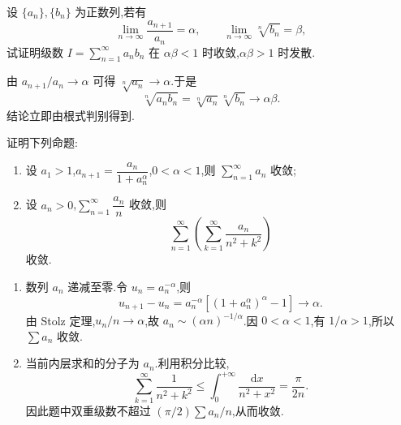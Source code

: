 \begin{example}
    设 $\{a_n\},\{b_n\}$ 为正数列,若有
    \[
        \displaystyle\lim\limits_{n\to\infty}\dfrac{a_{n+1}}{a_n}=\alpha,
        \qquad
        \lim\limits_{n\to\infty}\sqrt[n]{b_n}=\beta,
    \]
    试证明级数 $\displaystyle I=\sum\limits_{n=1}^{\infty}a_nb_n$ 在 $\alpha\beta<1$ 时收敛,$\alpha\beta>1$ 时发散.
\end{example}
\exampleblank

\begin{solution}
    由 $a_{n+1}/a_n\to\alpha$ 可得 $\sqrt[n]{a_n}\to\alpha$.于是
    \[
        \sqrt[n]{a_nb_n}=\sqrt[n]{a_n}\sqrt[n]{b_n}\longrightarrow\alpha\beta.
    \]
    结论立即由根式判别得到.
\end{solution}




\begin{example}
    证明下列命题:
    \begin{enumerate}
        \item 设 $a_1>1$,$\displaystyle a_{n+1}=\dfrac{a_n}{1+a_n^\alpha}$,$0<\alpha<1$,则 $\displaystyle\sum\limits_{n=1}^{\infty}a_n$ 收敛;
        \item 设 $a_n>0$,$\displaystyle\sum\limits_{n=1}^{\infty}\dfrac{a_n}{n}$ 收敛,则
              \[
                  \displaystyle\sum\limits_{n=1}^{\infty}\left(\sum\limits_{k=1}^{\infty}\dfrac{a_n}{n^2+k^2}\right)
              \]
              收敛.
    \end{enumerate}
\end{example}
\exampleblank

\begin{solution}
    \leavevmode
    \begin{enumerate}
        \item 数列 $a_n$ 递减至零.令 $u_n=a_n^{-\alpha}$,则
              \[
                  u_{n+1}-u_n
                  =a_n^{-\alpha}\left[(1+a_n^\alpha)^\alpha-1\right]\longrightarrow\alpha.
              \]
              由 Stolz 定理,$u_n/n\to\alpha$,故
              $a_n\sim(\alpha n)^{-1/\alpha}$.因 $0<\alpha<1$,有 $1/\alpha>1$,所以 $\displaystyle \sum a_n$ 收敛.
        \item 当前内层求和的分子为 $a_n$.利用积分比较,
              \[
                  \displaystyle\sum\limits_{k=1}^{\infty}\dfrac{1}{n^2+k^2}
                  \leq\int_0^{+\infty}\dfrac{\mathrm{d}x}{n^2+x^2}
                  =\dfrac{\pi}{2n}.
              \]
              因此题中双重级数不超过 $\displaystyle (\pi/2)\sum a_n/n$,从而收敛.
    \end{enumerate}
\end{solution}

